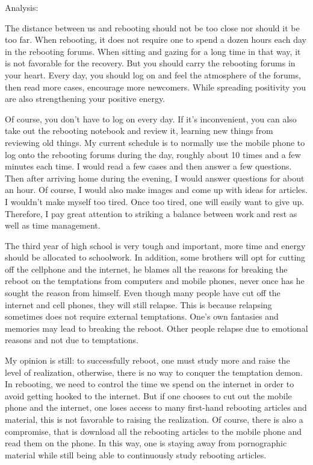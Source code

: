 \documentclass[
]{book}
\begin{document}
Analysis:

The distance between us and rebooting should not be too close nor should it be too far. When rebooting, it does not require one to spend a dozen hours each day in the rebooting forums. When sitting and gazing for a long time in that way, it is not favorable for the recovery. But you should carry the rebooting forums in your heart. Every day, you should log on and feel the atmosphere of the forums, then read more cases, encourage more newcomers. While spreading positivity you are also strengthening your positive energy.

Of course, you don't have to log on every day. If it's inconvenient, you can also take out the rebooting notebook and review it, learning new things from reviewing old things. My current schedule is to normally use the mobile phone to log onto the rebooting forums during the day, roughly about 10 times and a few minutes each time. I would read a few cases and then answer a few questions. Then after arriving home during the evening, I would answer questions for about an hour. Of course, I would also make images and come up with ideas for articles. I wouldn't make myself too tired. Once too tired, one will easily want to give up. Therefore, I pay great attention to striking a balance between work and rest as well as time management.

The third year of high school is very tough and important, more time and energy should be allocated to schoolwork. In addition, some brothers will opt for cutting off the cellphone and the internet, he blames all the reasons for breaking the reboot on the temptations from computers and mobile phones, never once has he sought the reason from himself. Even though many people have cut off the internet and cell phones, they will still relapse. This is because relapsing sometimes does not require external temptations. One's own fantasies and memories may lead to breaking the reboot. Other people relapse due to emotional reasons and not due to temptations.

My opinion is still: to successfully reboot, one must study more and raise the level of realization, otherwise, there is no way to conquer the temptation demon. In rebooting, we need to control the time we spend on the internet in order to avoid getting hooked to the internet. But if one chooses to cut out the mobile phone and the internet, one loses access to many first-hand rebooting articles and material, this is not favorable to raising the realization. Of course, there is also a compromise, that is download all the rebooting articles to the mobile phone and read them on the phone. In this way, one is staying away from pornographic material while still being able to continuously study rebooting articles.
\end{document}
